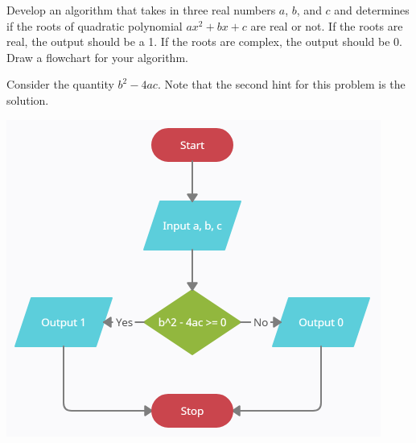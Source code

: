 \documentclass{ximera}
\begin{document}
\begin{question}
	Develop an algorithm that takes in three real numbers $a$, $b$, and $c$ and determines if the roots of quadratic polynomial $ax^2+bx+c$ are real or not. If the roots are real, the output should be a 1. If the roots are complex, the output should be 0. Draw a flowchart for your algorithm.
	\begin{hint}
		Consider the quantity $b^2-4ac$. Note that the second hint for this problem is the solution.
	\end{hint}
	
	\begin{hint}
		\begin{center}
			\includegraphics{realornot.png}
		\end{center}
	\end{hint}
\end{question}
\end{document}
